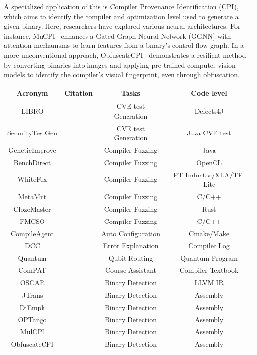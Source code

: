 \documentclass[pdflatex,sn-mathphys-ay,twocolumn, a4paper]{sn-jnl}%
\theoremstyle{thmstyleone}%
\theoremstyle{thmstyletwo}%
\theoremstyle{thmstylethree}%
\begin{document}
A specialized application of this is Compiler Provenance Identification (CPI), which aims to identify the compiler and optimization level used to generate a given binary. Here, researchers have explored various neural architectures. For instance, MuCPI~\citep{117_2024} enhances a Gated Graph Neural Network (GGNN) with attention mechanisms to learn features from a binary's control flow graph. In a more unconventional approach, ObfuscateCPI~\citep{118_2024} demonstrates a resilient method by converting binaries into images and applying pre-trained computer vision models to identify the compiler's visual fingerprint, even through obfuscation.

\begin{table}
    \centering
    \begin{tabular}{|c|c|c|c|}
    \hline
    \textbf{Acronym} & \textbf{Citation} & \textbf{Tasks} & \textbf{Code level} \\
    \hline
    LIBRO & \citet{150_kang2023large} & CVE test Generation & Defects4J \\
    SecurityTestGen & \citet{144_zhang2023doesllmgeneratesecurity} & CVE test Generation & Java CVE test \\
    GeneticImprove & \citet{147_brownlee2023enhancing} & Compiler Fuzzing & Java \\
    BenchDirect & \citet{139_tsimpourlas2023benchdirectdirectedlanguagemodel} & Compiler Fuzzing & OpenCL \\
    WhiteFox & \citet{31_yang2024whitefox} & Compiler Fuzzing & PT-Inductor/XLA/TF-Lite \\
    MetaMut & \citet{76_ou2024mutators_asplos} & Compiler Fuzzing & C/C++ \\
    ClozeMaster & \citet{53_gao2025clozemaster} & Compiler Fuzzing & Rust \\
    FMCSO & \citet{14_italiano2025finding} & Compiler Fuzzing & C/C++ \\

    CompileAgent & \citet{8_hu2025compileagent_acl} & Auto Configuration & Cmake/Make \\
    DCC & \citet{80_dcc2024} & Error Explanation & Compiler Log \\
    Quantum & \citet{89_quantum2024_dac} & Qubit Routing & Quantum Program \\
    ComPAT & \citet{94_compat2024} & Course Assistant & Compiler Textbook \\
    OSCAR & \citet{170_how2021_icml} & Binary Detection & LLVM IR \\
    JTrans & \citet{160_jtrans2022_issta} & Binary Detection & Assembly \\
    DiEmph & \citet{137_2023_issta} & Binary Detection & Assembly \\
    OPTango & \citet{141_optango2023_issre} & Binary Detection & Assembly \\
    MulCPI & \citet{117_2024} & Binary Detection & Assembly \\
    ObfuscateCPI & \citet{118_2024} & Binary Detection & Assembly \\
    

\end{tabular}
\end{table}
\end{document}
